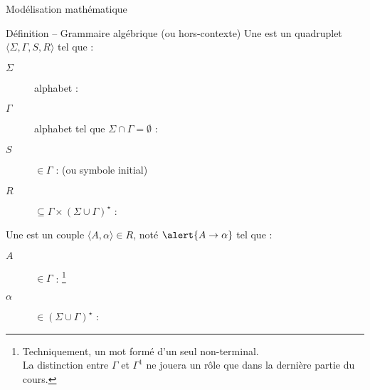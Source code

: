 
\begingroup
\begin{frame}{Modélisation mathématique}
  \begin{block}{Définition -- Grammaire algébrique (ou hors-contexte)}
    \vspace{2mm}
    Une  est un quadruplet \alert{$\langle \Sigma, \Gamma, S, R \rangle$} tel que :
    \begin{description}
    \item[\alert{$\Sigma$}] alphabet : 
    \item[\alert{$\Gamma$}] alphabet tel que $\Sigma \cap \Gamma = \emptyset$ : 
    \item[\alert{$S$}] $\in \Gamma$ :  (ou symbole initial)
    \item[\alert{$R$}] $\subseteq \Gamma \times (\Sigma \cup \Gamma)^\star$ : 
    \end{description}

    \vspace{3mm}
    Une  est un couple \alert{$\langle A, \alpha \rangle \in R$}, noté $\alert{A \rightarrow \alpha}$ tel que :
    \begin{description}
    \item[\alert{$A$}] $\in \Gamma$ :  \footnote[frame]{Techniquement, un mot formé d'un seul non-terminal.\\
      La distinction entre $\Gamma$ et $\Gamma^1$ ne jouera un rôle que dans la dernière partie du cours.}
    \item[\alert{$\alpha$}] $\in (\Sigma \cup \Gamma)^\star$ : 
    \end{description}
  \end{block}

\end{frame}

\endgroup
